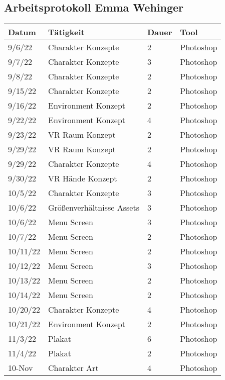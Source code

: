 \subsection{Arbeitsprotokoll Emma Wehinger}

\begin{longtable}{|p{1.5cm}|p{5.5cm}|p{1.2cm}|p{3.2cm}|}
	\hline
	\textbf{Datum} & \textbf{Tätigkeit} & \textbf{Dauer} & \textbf{Tool} \\ \hline
	\endhead
	9/6/22 & Charakter Konzepte & 2 & Photoshop \\ \hline
	9/7/22 & Charakter Konzepte & 3 & Photoshop \\ \hline
	9/8/22 & Charakter Konzepte & 2 & Photoshop \\ \hline
	9/15/22 & Charakter Konzepte & 2 & Photoshop \\ \hline
	9/16/22 & Environment Konzept & 2 & Photoshop \\ \hline
	9/22/22 & Environment Konzept & 4 & Photoshop \\ \hline
	9/23/22 & VR Raum Konzept & 2 & Photoshop \\ \hline
	9/29/22 & VR Raum Konzept & 2 & Photoshop \\ \hline
	9/29/22 & Charakter Konzepte & 4 & Photoshop \\ \hline
	9/30/22 & VR Hände Konzept & 2 & Photoshop \\ \hline
	10/5/22 & Charakter Konzepte & 3 & Photoshop \\ \hline
	10/6/22 & Größenverhältnisse Assets & 3 & Photoshop \\ \hline
	10/6/22 & Menu Screen & 3 & Photoshop \\ \hline
	10/7/22 & Menu Screen & 2 & Photoshop \\ \hline
	10/11/22 & Menu Screen & 2 & Photoshop \\ \hline
	10/12/22 & Menu Screen & 3 & Photoshop \\ \hline
	10/13/22 & Menu Screen & 2 & Photoshop \\ \hline
	10/14/22 & Menu Screen & 2 & Photoshop \\ \hline
	10/20/22 & Charakter Konzepte & 4 & Photoshop \\ \hline
	10/21/22 & Environment Konzept & 2 & Photoshop \\ \hline
	11/3/22 & Plakat & 6 & Photoshop \\ \hline
	11/4/22 & Plakat & 2 & Photoshop \\ \hline
	10-Nov & Charakter Art & 4 & Photoshop \\ \hline

\end{longtable}

